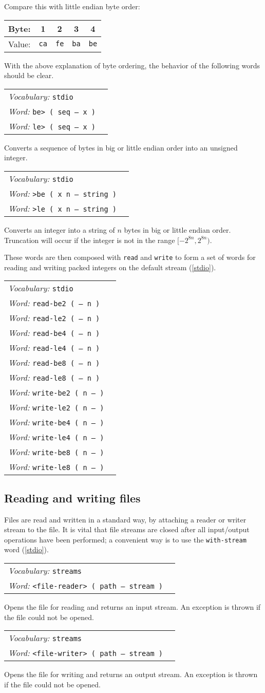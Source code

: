\documentclass{book}
\newcommand{\vocabulary}[1]{\emph{Vocabulary:} \texttt{#1}&\\}
\newcommand{\ordinaryword}[2]{\index{\texttt{#1}}\emph{Word:} \texttt{#2}&\\}
\newcommand{\wordtable}[1]{


\begin{tabularx}{12cm}{lX}
\hline
#1
\hline
\end{tabularx}

}
\begin{document}
Compare this with little endian byte order:

\begin{tabular}{l|c|c|c|c}
Byte:&1&2&3&4\\
\hline
Value:&\verb|ca|&\verb|fe|&\verb|ba|&\verb|be|\\
\end{tabular}

With the above explanation of byte ordering, the behavior of the following words should be clear.

\wordtable{
\vocabulary{stdio}
\ordinaryword{be>}{be> ( seq -- x )}
\ordinaryword{le>}{le> ( seq -- x )}
}
Converts a sequence of bytes in big or little endian order into an unsigned integer.
\wordtable{
\vocabulary{stdio}
\ordinaryword{>be}{>be ( x n -- string )}
\ordinaryword{>le}{>le ( x n -- string )}
}
Converts an integer into a string of $n$ bytes in big or little endian order. Truncation will occur if the integer is not in the range $[-2^{8n},2^{8n})$.

These words are then composed with \verb|read| and \verb|write| to form a set of words for reading and writing packed integers on the default stream (\ref{stdio}).

\wordtable{
\vocabulary{stdio}
\ordinaryword{read-be2}{read-be2 ( -- n )}
\ordinaryword{read-le2}{read-le2 ( -- n )}
\ordinaryword{read-be4}{read-be4 ( -- n )}
\ordinaryword{read-le4}{read-le4 ( -- n )}
\ordinaryword{read-be8}{read-be8 ( -- n )}
\ordinaryword{read-le8}{read-le8 ( -- n )}
\ordinaryword{write-be2}{write-be2 ( n -- )}
\ordinaryword{write-le2}{write-le2 ( n -- )}
\ordinaryword{write-be4}{write-be4 ( n -- )}
\ordinaryword{write-le4}{write-le4 ( n -- )}
\ordinaryword{write-be8}{write-be8 ( n -- )}
\ordinaryword{write-le8}{write-le8 ( n -- )}
}

\subsection{Reading and writing files}

Files are read and written in a standard way, by attaching a reader or writer stream to the file. It is vital that file streams are closed after all input/output operations have been performed; a convenient way is to use the \verb|with-stream| word (\ref{stdio}).

\wordtable{
\vocabulary{streams}
\ordinaryword{<file-reader>}{<file-reader> ( path -- stream )}

}
Opens the file for reading and returns an input stream. An exception is thrown if the file could not be opened.
\wordtable{
\vocabulary{streams}
\ordinaryword{<file-writer>}{<file-writer> ( path -- stream )}

}
Opens the file for writing and returns an output stream. An exception is thrown if the file could not be opened.
\end{document}
